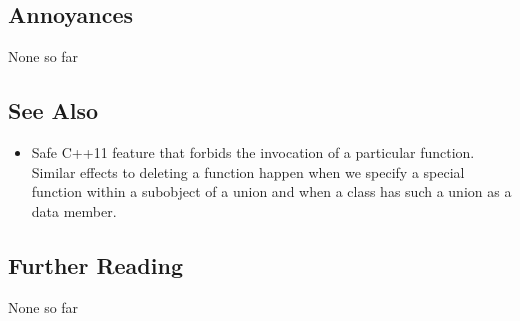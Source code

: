 \subsection[Annoyances]{Annoyances}\label{annoyances}

None so far

\subsection[See Also]{See Also}\label{see-also}

\begin{itemize}
\item{%
Safe C++11 feature that forbids the invocation of a particular function. Similar effects to deleting a function happen when we specify a special function within a subobject of a union and when a class has such a union as a data member.} %
\end{itemize}

\subsection[Further Reading]{Further Reading}\label{further-reading}

None so far


